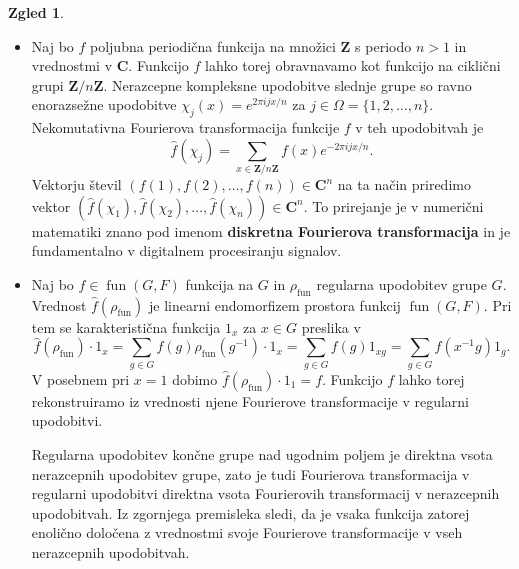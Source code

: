 \documentclass[11pt]{book}
\def\ZZ{\mathbf{Z}}
\def\CC{\mathbf{C}}
\DeclareMathOperator\fun{fun}
\def\definicija{\color{rdeca}\bf}
\theoremstyle{definition}
\theoremstyle{zgled}
\newtheorem{zgled}[theorem]{Zgled}
\theoremstyle{zgledbrezstevilke}
\theoremstyle{odprtproblem}
\theoremstyle{domacanaloga}
\theoremstyle{izrek}
\begin{document}
\begin{zgled} \leavevmode
\begin{itemize}
    \item Naj bo $f$ poljubna periodična funkcija na množici $\ZZ$ s periodo $n > 1$ in vrednostmi v $\CC$. Funkcijo $f$ lahko torej obravnavamo kot funkcijo na ciklični grupi $\ZZ/n\ZZ$. Nerazcepne kompleksne upodobitve slednje grupe so ravno enorazsežne upodobitve $\chi_j(x) = e^{2 \pi i j x / n}$ za $j \in \Omega = \{ 1, 2, \dots, n \}$. Nekomutativna Fourierova transformacija funkcije $f$ v teh upodobitvah je
    \[
        \hat{f}(\chi_j) = \sum_{x \in \ZZ/n\ZZ} f(x) e^{- 2 \pi i j x / n }.
    \]
    Vektorju števil $(f(1), f(2), \dots, f(n)) \in \CC^n$ na ta način priredimo vektor $(\hat{f}(\chi_1), \hat{f}(\chi_2), \dots, \hat{f}(\chi_n)) \in \CC^n$. To prirejanje je v numerični matematiki znano pod imenom {\definicija diskretna Fourierova transformacija} in je fundamentalno v digitalnem procesiranju signalov.

    \item Naj bo $f \in \fun(G,F)$ funkcija na $G$ in $\rho_{\fun}$ regularna upodobitev grupe $G$. Vrednost $\hat{f}(\rho_{\fun})$ je linearni endomorfizem prostora funkcij $\fun(G,F)$. Pri tem se karakteristična funkcija $1_x$ za $x \in G$ preslika v
\[
    \hat{f}(\rho_{\fun}) \cdot 1_x 
    = \sum_{g \in G} f(g) \rho_{\fun}(g^{-1}) \cdot 1_x
    = \sum_{g \in G} f(g) 1_{xg}
    = \sum_{g \in G} f(x^{-1}g) 1_{g}.
\] 
V posebnem pri $x = 1$ dobimo $\hat{f}(\rho_{\fun}) \cdot 1_1 = f$. Funkcijo $f$ lahko torej rekonstruiramo iz vrednosti njene Fourierove transformacije v regularni upodobitvi. 

Regularna upodobitev končne grupe nad ugodnim poljem je direktna vsota nerazcepnih upodobitev grupe, zato je tudi Fourierova transformacija v regularni upodobitvi direktna vsota Fourierovih transformacij v nerazcepnih upodobitvah. Iz zgornjega premisleka sledi, da je vsaka funkcija zatorej enolično določena z vrednostmi svoje Fourierove transformacije v vseh nerazcepnih upodobitvah.
\end{itemize}
\end{zgled}
\end{document}
